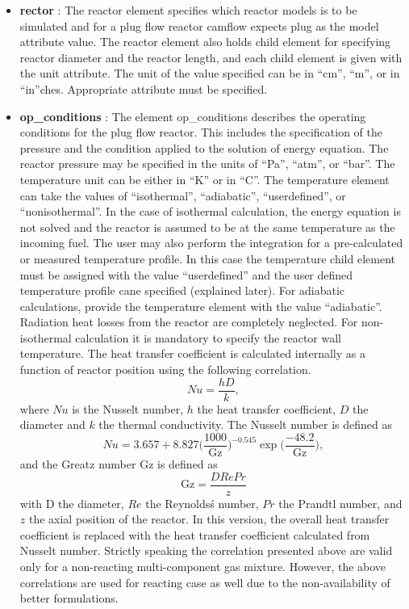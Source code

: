 \begin{itemize}
 \item \textbf{rector} : The reactor element specifies which reactor models is to be simulated and for a plug flow reactor camflow expects plug as the model attribute value. The reactor element also holds child element for specifying reactor diameter and the reactor length, and each child element is given with the unit attribute. The unit of the value specified can be in ``cm'', ``m'', or in ``in''ches. Appropriate attribute must be specified.

\item \textbf{op\_conditions} : The element op\_conditions describes the operating conditions for the plug flow reactor. This includes the specification of the pressure and the condition applied to the solution of energy equation. The reactor pressure may be specified in the units of ``Pa'', ``atm'', or ``bar''. The temperature unit can be either in ``K'' or in ``C''. The temperature element can take the values of ``isothermal'', ``adiabatic'', ``userdefined'', or ``nonisothermal''. In the case of isothermal calculation, the energy equation is not solved and the reactor is assumed to be at the same temperature as the incoming fuel. The user may also perform the integration for a pre-calculated or measured temperature profile. In this case the temperature child element must be assigned with the value ``userdefined'' and the user defined temperature profile cane specified (explained later). For adiabatic calculations, provide the temperature element with the value ``adiabatic''. Radiation heat losses from the reactor are completely neglected. For non-isothermal calculation it is mandatory to specify the reactor wall temperature. The heat transfer coefficient is calculated internally as a function of reactor position using the following correlation.
\begin{equation}
 Nu= \frac{hD}{k},
\end{equation}
where $Nu$ is the Nusselt number, $h$ the heat transfer coefficient, $D$ the diameter and $k$ the thermal conductivity. The Nusselt number is defined as
\begin{equation}
 Nu = 3.657+8.827\bigg(\frac{1000}{\mathrm{Gz}}\bigg)^{-0.545} \exp\bigg(\frac{-48.2}{\mathrm{Gz}}\bigg),
\end{equation}
and the Greatz number Gz is defined as
\begin{equation}
 \mathrm{Gz} = \frac{D Re Pr}{z}
\end{equation}
with D the diameter, $Re$ the Reynolds\'s number, $Pr$ the Prandtl number, and $z$ the axial position of the reactor. In this version, the overall heat transfer coefficient is replaced with the heat transfer coefficient calculated from Nusselt number. Strictly speaking the correlation presented above are valid only for a non-reacting multi-component gas mixture. However, the above correlations are used for reacting case as well due to the non-availability of better formulations.\\


\end{itemize}

